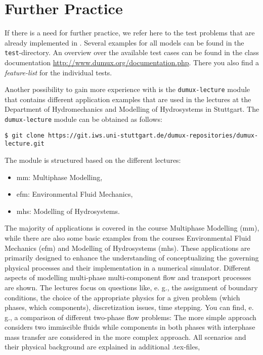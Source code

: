\section{Further Practice}
\label{tutorial-furtherpractice}

If there is a need for further practice, we refer here to the test problems that
are already implemented in \Dumux. Several examples for all models
can be found in the \texttt{test}-directory. An overview over the available test
cases can be found in the class documentation \url{http://www.dumux.org/documentation.php}.
There you also find a \emph{feature-list} for the individual tests.%

Another possibility to gain more experience with \Dumux is the \texttt{dumux-lecture} module
that contains different application examples that are used in the lectures at the 
Department of Hydromechanics and Modelling of Hydrosystems in Stuttgart.
The \texttt{dumux-lecture} module can be obtained as follows:
\begin{lstlisting}[style=Bash]
$ git clone https://git.iws.uni-stuttgart.de/dumux-repositories/dumux-lecture.git
\end{lstlisting}
The module is structured based on the different lectures: 
\begin{itemize}
\item mm: Multiphase Modelling,
\item efm: Environmental Fluid Mechanics,
\item mhs: Modelling of Hydrosystems.
\end{itemize}
The majority of applications is covered in the course Multiphase Modelling (mm), 
while there are also some basic examples from the
courses Environmental Fluid Mechanics (efm) and Modelling of Hydrosystems (mhs). 
These applications are primarily designed to enhance the understanding of conceptualizing the
governing physical processes and their implementation in a numerical simulator. 
Different aspects of modelling multi-phase multi-component flow and transport processes are shown.
The lectures focus on questions like, e. g., the assignment of boundary conditions, the choice of the 
appropriate physics for a given problem (which phases, which components), discretization issues,
time stepping. You can find, e. g., a comparison of different two-phase flow problems: The
more simple approach considers two immiscible fluids while components in both phases with interphase
mass transfer are considered in the more complex approach.
All scenarios and their physical background are explained in additional .tex-files,
